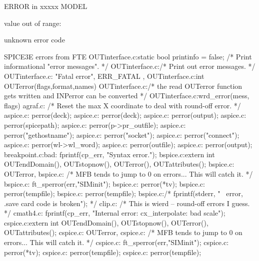 ERROR in xxxxx MODEL

value out of range:

unknown error code





SPICE3E errors from FTE
OUTinterface.c:static bool printinfo = false;	/* Print informational "error messages". */
OUTinterface.c:/* Print out error messages. */
OUTinterface.c:        { "Fatal error", ERR_FATAL } ,
OUTinterface.c:int OUTerror(flags,format,names) 
OUTinterface.c:/* the read OUTerror function gets written and INPerror can be converted */
OUTinterface.c:wrd_error(mess, flags)
agraf.c:    /* Reset the max X coordinate to deal with round-off error. */
aspice.c:        perror(deck);
aspice.c:            perror(deck);
aspice.c:            perror(output);
aspice.c:        perror(spicepath);
aspice.c:            perror(p->pr_outfile);
aspice.c:        perror("gethostname");
aspice.c:        perror("socket");
aspice.c:        perror("connect");
aspice.c:                perror(wl->wl_word);
aspice.c:        perror(outfile);
aspice.c:        perror(output);
breakpoint.c:bad:    fprintf(cp_err, "Syntax error.\n");
bspice.c:extern int OUTendDomain(), OUTstopnow(), OUTerror(), OUTattributes();
bspice.c:    OUTerror,
bspice.c:    /* MFB tends to jump to 0 on errors... This will catch it. */
bspice.c:        ft_sperror(err,"SIMinit");
bspice.c:                            perror(*tv);
bspice.c:                perror(tempfile);
bspice.c:                        perror(tempfile);
bspice.c:/* fprintf(stderr, "error, .save card code is broken\n"); */
clip.c:        /* This is wierd -- round-off errors I guess. */
cmath4.c:        fprintf(cp_err, "Internal error: cx_interpolate: bad scale\n");
cspice.c:extern int OUTendDomain(), OUTstopnow(), OUTerror(), OUTattributes();
cspice.c:    OUTerror,
cspice.c:    /* MFB tends to jump to 0 on errors... This will catch it. */
cspice.c:        ft_sperror(err,"SIMinit");
cspice.c:                            perror(*tv);
cspice.c:                perror(tempfile);
cspice.c:                        perror(tempfile);

